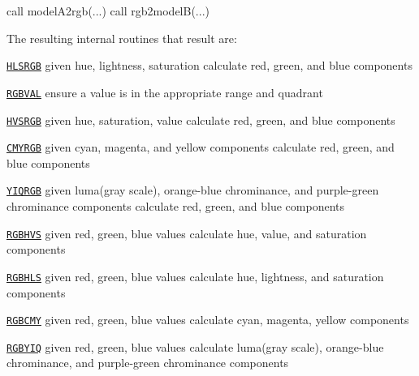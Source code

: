 \begin{DoxyDescription}
\begin{DoxyPre}\end{DoxyPre}



\begin{DoxyPre}     call modelA2rgb(...)
     call rgb2modelB(...)
 \end{DoxyPre}




The resulting internal routines that result are\+: 




\begin{DoxyItemize}
\item \href{#HLSRGB}{\tt H\+L\+S\+R\+GB} given hue, lightness, saturation calculate red, green, and blue components 
\begin{DoxyItemize}
\item \href{#RGBVAL}{\tt R\+G\+B\+V\+AL} ensure a value is in the appropriate range and quadrant  
\end{DoxyItemize}
\item \href{#HVSRGB}{\tt H\+V\+S\+R\+GB} given hue, saturation, value calculate red, green, and blue components  
\item \href{#CMYRGB}{\tt C\+M\+Y\+R\+GB} given cyan, magenta, and yellow components calculate red, green, and blue components  
\item \href{#YIQRGB}{\tt Y\+I\+Q\+R\+GB} given luma(gray scale), orange-\/blue chrominance, and purple-\/green chrominance components calculate red, green, and blue components 


\item \href{#RGBHVS}{\tt R\+G\+B\+H\+VS} given red, green, blue values calculate hue, value, and saturation components  
\item \href{#RGBHLS}{\tt R\+G\+B\+H\+LS} given red, green, blue values calculate hue, lightness, and saturation components  
\item \href{#RGBCMY}{\tt R\+G\+B\+C\+MY} given red, green, blue values calculate cyan, magenta, yellow components  
\item \href{#RGBYIQ}{\tt R\+G\+B\+Y\+IQ} given red, green, blue values calculate luma(gray scale), orange-\/blue chrominance, and purple-\/green chrominance components 


\end{DoxyItemize}


\item[S\+EE A\+L\+SO  ]




\end{DoxyDescription}
